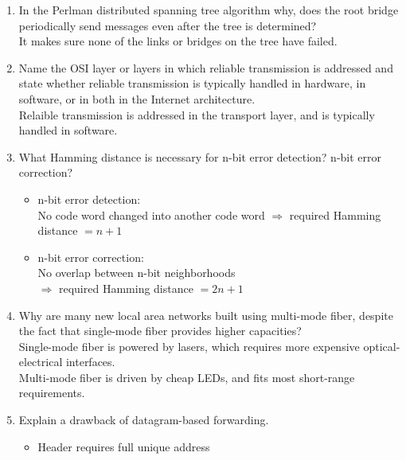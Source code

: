 \documentclass[10pt, a4paper]{article}
\begin{document}
\begin{enumerate}
    \color{black}
\item\mbox{}In the Perlman distributed spanning tree algorithm why, does the root bridge periodically send messages even after the tree is determined?\\
    \color{blue}
    It makes sure none of the links or bridges on the tree have failed.
    \color{black}
\item\mbox{}Name the OSI layer or layers in which reliable transmission is addressed and state whether reliable transmission is typically handled in hardware, in software, or in both in the Internet architecture.\\
    \color{blue}
    Relaible transmission is addressed in the transport layer, and is typically handled in software.
    \color{black}
\item\mbox{}What Hamming distance is necessary for n-bit error detection? n-bit error correction?
    \color{blue}
    \begin{itemize}
    \item n-bit error detection:\\
        No code word changed into another code word
        $\Rightarrow$ required Hamming distance $= n + 1$
    \item n-bit error correction:\\
        No overlap between n-bit neighborhoods\\
        $\Rightarrow$ required Hamming distance $= 2n + 1$
    \end{itemize}
    \color{black}
\item\mbox{}Why are many new local area networks built using multi-mode fiber, despite the fact that single-mode fiber provides higher capacities?\\
    \color{blue}
    Single-mode fiber is powered by lasers, which requires more expensive optical-electrical interfaces.\\
    Multi-mode fiber is driven by cheap LEDs, and fits most short-range requirements.
    \color{black}
\item\mbox{} Explain a drawback of datagram-based forwarding.
    \color{blue}
    \begin{itemize}
    \item Header requires full unique address

\end{itemize}
\end{enumerate}
\end{document}
